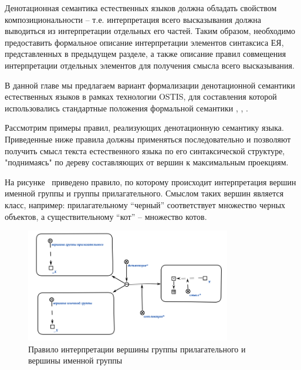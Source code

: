 Денотационная семантика естественных языков должна обладать свойством композициональности -- т.е. интерпретация всего высказывания должна выводиться из интерпретации отдельных его частей. Таким образом, необходимо предоставить формальное описание интерпретации элементов синтаксиса ЕЯ, представленных в предыдущем разделе, а также описание правил совмещения интерпретации отдельных элементов для получения смысла всего высказывания.

В данной главе мы предлагаем вариант формализации денотационной семантики естественных языков в рамках технологии OSTIS, для составления которой использовались стандартные положения формальной семантики , , .

Рассмотрим примеры правил, реализующих денотационную семантику языка. Приведенные ниже правила должны применяться последовательно и позволяют получить смысл текста естественного языка по его синтаксической структуре, "поднимаясь" по дереву составляющих от вершин к максимальным проекциям.

На рисунке~\textit{} приведено правило, по которому происходит интерпретация вершин именной группы и группы прилагательного.
Смыслом таких вершин является класс, например: прилагательному ``черный'' соответствует множество черных объектов, а существительному ``кот'' -- множество котов.

\begin{figure}[H]
    \centering
    \includegraphics[width=0.8\textwidth]{images/part2/chapter_lang/d_sem_1}
    \caption{Правило интерпретации вершины группы прилагательного и вершины именной группы}
    \label{fig:d_sem_1}
\end{figure}


